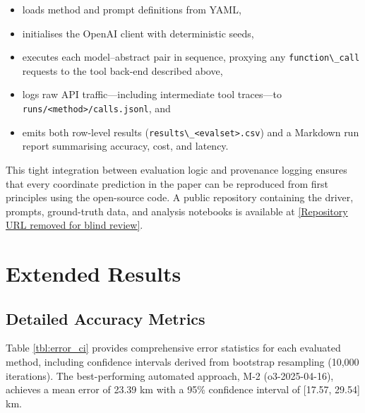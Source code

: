 \begin{itemize}
\tightlist
\item
  loads method and prompt definitions from YAML,
\item
  initialises the OpenAI client with deterministic seeds,
\item
  executes each model--abstract pair in sequence, proxying any
  \passthrough{\lstinline!function\_call!} requests to the tool back-end
  described above,
\item
  logs raw API traffic---including intermediate tool traces---to
  \passthrough{\lstinline!runs/<method>/calls.jsonl!}, and
\item
  emits both row-level results
  (\passthrough{\lstinline!results\_<evalset>.csv!}) and a Markdown run
  report summarising accuracy, cost, and latency.
\end{itemize}

This tight integration between evaluation logic and provenance logging
ensures that every coordinate prediction in the paper can be reproduced
from first principles using the open-source code. A public repository
containing the driver, prompts, ground-truth data, and analysis
notebooks is available at
\url{[Repository URL removed for blind review]}.

\section{Extended
Results}\label{appendix-b-extended-results}

\subsection{Detailed Accuracy
Metrics}\label{b.1-detailed-accuracy-metrics}

Table \ref{tbl:error_ci} provides comprehensive error statistics for
each evaluated method, including confidence intervals derived from
bootstrap resampling (10,000 iterations). The best-performing automated
approach, M-2 (o3-2025-04-16), achieves a mean error of 23.39 km with a
95\% confidence interval of {[}17.57, 29.54{]} km.

